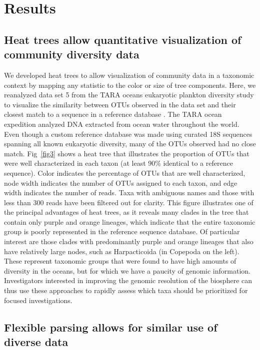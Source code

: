 \documentclass[10pt,letterpaper]{article}
\begin{document}
\section*{Results}\label{results}


\subsection*{Heat trees allow quantitative visualization of community
	diversity
	data}\label{heat-trees-allow-quantitative-visualization-of-community-diversity-data}

We developed heat trees to allow visualization of community data in a
taxonomic context by mapping any statistic to the color or size of tree
components. Here, we reanalyzed data set 5 from the TARA oceans
eukaryotic plankton diversity study to visualize the similarity between
OTUs observed in the data set and their closest match to a sequence in a
reference database \cite{de2015eukaryotic}. The TARA ocean expedition
analyzed DNA extracted from ocean water throughout the world. Even
though a custom reference database was made using curated 18S sequences
spanning all known eukaryotic diversity, many of the OTUs observed had
no close match. Fig~\ref{fig3} shows a heat tree that illustrates the
proportion of OTUs that were well characterized in each taxon (at least
90\% identical to a reference sequence). Color indicates the percentage
of OTUs that are well characterized, node width indicates the number of
OTUs assigned to each taxon, and edge width indicates the number of
reads. Taxa with ambiguous names and those with less than 300 reads have
been filtered out for clarity. This figure illustrates one of the
principal advantages of heat trees, as it reveals many clades in the
tree that contain only purple and orange lineages, which indicate that
the entire taxonomic group is poorly represented in the reference
sequence database. Of particular interest are those clades with
predominantly purple and orange lineages that also have relatively large
nodes, such as Harpacticoida (in Copepoda on the left). These represent
taxonomic groups that were found to have high amounts of diversity in
the oceans, but for which we have a paucity of genomic information.
Investigators interested in improving the genomic resolution of the
biosphere can thus use these approaches to rapidly assess which taxa
should be prioritized for focused investigations.


\subsection*{Flexible parsing allows for similar use of diverse
	data}\label{flexible-parsing-allows-for-similar-use-of-diverse-data}
\end{document}
